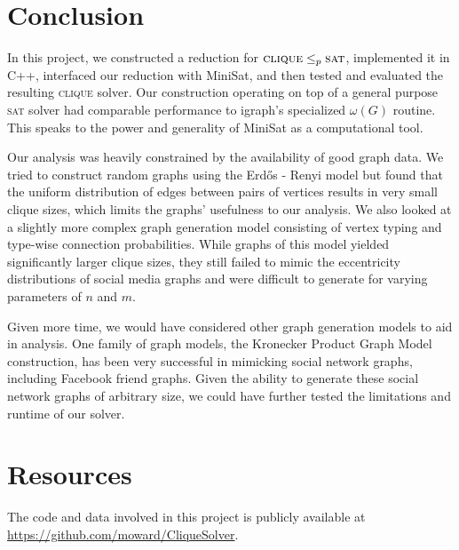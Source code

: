 \documentclass[]{article}
\newcommand{\clique}{\textsc{clique}}
\newcommand{\sat}{\textsc{sat}}
\begin{document}
	\section{Conclusion}
	In this project, we constructed a reduction for $\clique \le_p \sat$, implemented it in C++, interfaced our reduction with MiniSat, and then tested and evaluated the resulting \clique{} solver. Our construction operating on top of a general purpose \sat{} solver had comparable performance to igraph's specialized $\omega(G)$ routine. This speaks to the power and generality of MiniSat as a computational tool.
	
	Our analysis was heavily constrained by the availability of good graph data. We tried to construct random graphs using the Erdős - Renyi model but found that the uniform distribution of edges between pairs of vertices results in very small clique sizes, which limits the graphs' usefulness to our analysis. We also looked at a slightly more complex graph generation model consisting of vertex typing and type-wise connection probabilities. While graphs of this model yielded significantly larger clique sizes, they still failed to mimic the eccentricity distributions of social media graphs and were difficult to generate for varying parameters of $n$ and $m$.
	
	Given more time, we would have considered other graph generation models to aid in analysis. One family of graph models, the Kronecker Product Graph Model construction, has been very successful in mimicking social network graphs\cite{Leskovec:2010:KGA:1756006.1756039}, including Facebook friend graphs\cite{moreno2013block}. Given the ability to generate these social network graphs of arbitrary size, we could have further tested the limitations and runtime of our solver.
	
	\section{Resources}
	The code and data involved in this project is publicly available at \url{https://github.com/moward/CliqueSolver}.
	
	\printbibliography
\end{document}
